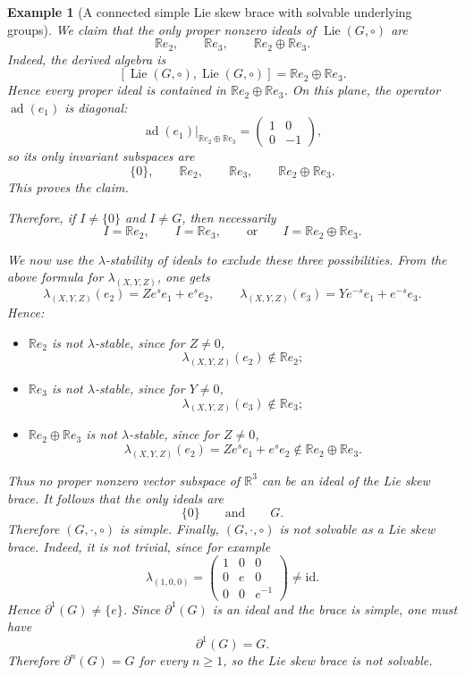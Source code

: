 \documentclass[reqno]{amsart}
\newtheorem{example}[theorem]{Example}
\newcommand{\R}{\mathbb R}
\DeclareMathOperator{\ad}{ad}
\DeclareMathOperator{\Lie}{Lie}
\newcommand{\id}{\mathrm{id}}
\begin{document}
\begin{example}[A connected simple Lie skew brace with solvable underlying groups]
We claim that the only proper nonzero ideals of
\(\Lie(G,\circ)\) are
\[
\R e_2,\qquad \R e_3,\qquad \R e_2\oplus \R e_3.
\]
Indeed, the derived algebra is
\[
[\Lie(G,\circ),\Lie(G,\circ)]
=
\R e_2\oplus \R e_3.
\]
Hence every proper ideal is contained in \(\R e_2\oplus \R e_3\). On this
plane, the operator \(\ad(e_1)\) is diagonal:
\[
\ad(e_1)|_{\R e_2\oplus \R e_3}
=
\begin{pmatrix}
1&0\\
0&-1
\end{pmatrix},
\]
so its only invariant subspaces are
\[
\{0\},\qquad \R e_2,\qquad \R e_3,\qquad \R e_2\oplus \R e_3.
\]
This proves the claim.

Therefore, if \(I\neq \{0\}\) and \(I\neq G\), then necessarily
\[
I=\R e_2,\qquad
I=\R e_3,
\qquad\text{or}\qquad
I=\R e_2\oplus \R e_3.
\]

We now use the \(\lambda\)-stability of ideals to exclude these three
possibilities. From the above formula for \(\lambda_{(X,Y,Z)}\), one gets
\[
\lambda_{(X,Y,Z)}(e_2)=Ze^{s}e_1+e^{s}e_2,
\qquad
\lambda_{(X,Y,Z)}(e_3)=Ye^{-s}e_1+e^{-s}e_3.
\]
Hence:
\begin{itemize}
    \item \(\R e_2\) is not \(\lambda\)-stable, since for \(Z\neq 0\),
    \[
    \lambda_{(X,Y,Z)}(e_2)\notin \R e_2;
    \]
    \item \(\R e_3\) is not \(\lambda\)-stable, since for \(Y\neq 0\),
    \[
    \lambda_{(X,Y,Z)}(e_3)\notin \R e_3;
    \]
    \item \(\R e_2\oplus \R e_3\) is not \(\lambda\)-stable, since for
    \(Z\neq 0\),
    \[
    \lambda_{(X,Y,Z)}(e_2)=Ze^{s}e_1+e^{s}e_2
    \notin \R e_2\oplus \R e_3.
    \]
\end{itemize}

Thus no proper nonzero vector subspace of \(\R^3\) can be an ideal of the Lie
skew brace. It follows that the only ideals are
\[
\{0\}\qquad\text{and}\qquad G.
\]
Therefore \((G,\cdot,\circ)\) is simple.
Finally, \((G,\cdot,\circ)\) is not solvable as a Lie skew brace. Indeed, it is
not trivial, since for example
\[
\lambda_{(1,0,0)}=
\begin{pmatrix}
1&0&0\\
0&e&0\\
0&0&e^{-1}
\end{pmatrix}
\neq \id.
\]
Hence \(\partial^1(G)\neq \{e\}\). Since \(\partial^1(G)\) is an ideal and the
brace is simple, one must have
\[
\partial^1(G)=G.
\]
Therefore \(\partial^n(G)=G\) for every \(n\ge 1\), so the Lie skew brace is
not solvable.
\end{example}
\end{document}

